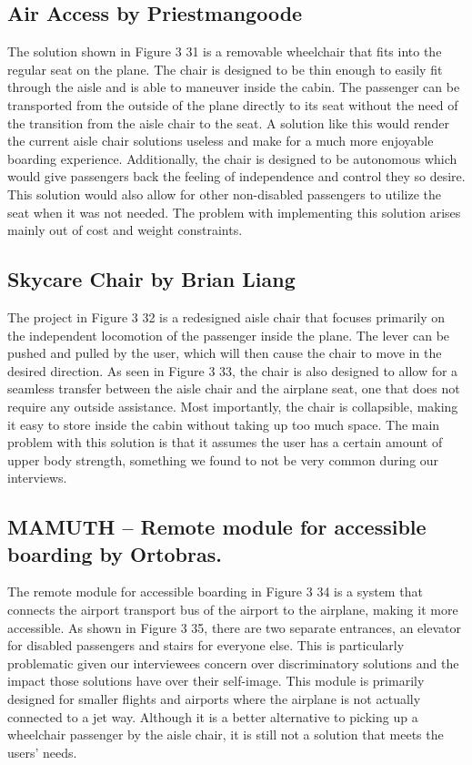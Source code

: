 \subsection{Air Access by Priestmangoode}
The solution shown in Figure 3 31 is a removable wheelchair that fits into the regular seat on the plane. The chair is designed to be thin enough to easily fit through the aisle and is able to maneuver inside the cabin. The passenger can be transported from the outside of the plane directly to its seat without the need of the transition from the aisle chair to the seat.  A solution like this would render the current aisle chair solutions useless and make for a much more enjoyable boarding experience. Additionally, the chair is designed to be autonomous which would give passengers back the feeling of independence and control they so desire. This solution would also allow for other non-disabled passengers to utilize the seat when it was not needed. The problem with implementing this solution arises mainly out of cost and weight constraints.

\subsection{Skycare Chair by Brian Liang}
The project in Figure 3 32 is a redesigned aisle chair that focuses primarily on the independent locomotion of the passenger inside the plane. The lever can be pushed and pulled by the user, which will then cause the chair to move in the desired direction. As seen in Figure 3 33, the chair is also designed to allow for a seamless transfer between the aisle chair and the airplane seat, one that does not require any outside assistance. Most importantly, the chair is collapsible, making it easy to store inside the cabin without taking up too much space.  The main problem with this solution is that it assumes the user has a certain amount of upper body strength, something we found to not be very common during our interviews.

\subsection{MAMUTH – Remote module for accessible boarding by Ortobras.}
The remote module for accessible boarding in Figure 3 34 is a system that connects the airport transport bus of the airport to the airplane, making it more accessible. As shown in Figure 3 35, there are two separate entrances, an elevator for disabled passengers and stairs for everyone else.  This is particularly problematic given our interviewees concern over discriminatory solutions and the impact those solutions have over their self-image. This module is primarily designed for smaller flights and airports where the airplane is not actually connected to a jet way. Although it is a better alternative to picking up a wheelchair passenger by the aisle chair, it is still not a solution that meets the users’ needs.  

